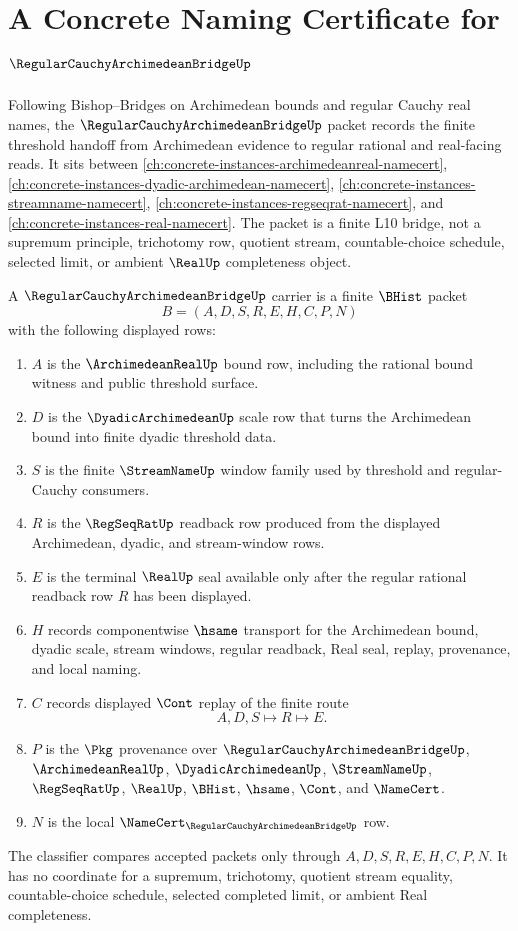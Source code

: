 \chapter{A Concrete Naming Certificate for $\RegularCauchyArchimedeanBridgeUp$}
\label{ch:concrete-instances-regular-cauchy-archimedean-bridge-namecert}

Following Bishop--Bridges on Archimedean bounds and regular Cauchy real names, the $\RegularCauchyArchimedeanBridgeUp$ packet records the finite threshold handoff from Archimedean evidence to regular rational and real-facing reads. It sits between \autoref{ch:concrete-instances-archimedeanreal-namecert}, \autoref{ch:concrete-instances-dyadic-archimedean-namecert}, \autoref{ch:concrete-instances-streamname-namecert}, \autoref{ch:concrete-instances-regseqrat-namecert}, and \autoref{ch:concrete-instances-real-namecert}. The packet is a finite L10 bridge, not a supremum principle, trichotomy row, quotient stream, countable-choice schedule, selected limit, or ambient $\RealUp$ completeness object.

\begin{definition}
\label{def:regular-cauchy-archimedean-bridge-carrier}
A $\RegularCauchyArchimedeanBridgeUp$ carrier is a finite $\BHist$ packet
$$
B=(A,D,S,R,E,H,C,P,N)
$$
with the following displayed rows:
\begin{enumerate}
\item $A$ is the $\ArchimedeanRealUp$ bound row, including the rational bound witness and public threshold surface.
\item $D$ is the $\DyadicArchimedeanUp$ scale row that turns the Archimedean bound into finite dyadic threshold data.
\item $S$ is the finite $\StreamNameUp$ window family used by threshold and regular-Cauchy consumers.
\item $R$ is the $\RegSeqRatUp$ readback row produced from the displayed Archimedean, dyadic, and stream-window rows.
\item $E$ is the terminal $\RealUp$ seal available only after the regular rational readback row $R$ has been displayed.
\item $H$ records componentwise $\hsame$ transport for the Archimedean bound, dyadic scale, stream windows, regular readback, Real seal, replay, provenance, and local naming.
\item $C$ records displayed $\Cont$ replay of the finite route
$$
A,D,S \longmapsto R \longmapsto E .
$$
\item $P$ is the $\Pkg$ provenance over $\RegularCauchyArchimedeanBridgeUp$, $\ArchimedeanRealUp$, $\DyadicArchimedeanUp$, $\StreamNameUp$, $\RegSeqRatUp$, $\RealUp$, $\BHist$, $\hsame$, $\Cont$, and $\NameCert$.
\item $N$ is the local $\NameCert_{\RegularCauchyArchimedeanBridgeUp}$ row.
\end{enumerate}
The classifier compares accepted packets only through $A,D,S,R,E,H,C,P,N$. It has no coordinate for a supremum, trichotomy, quotient stream equality, countable-choice schedule, selected completed limit, or ambient Real completeness.
\end{definition}

